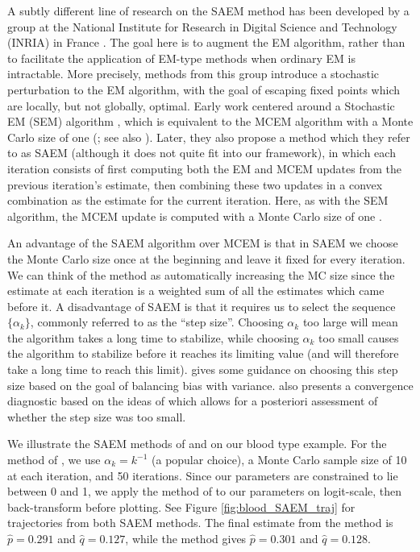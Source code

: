 \documentclass[11pt, oneside]{article}   	%
\begin{document}
A subtly different line of research on the SAEM method has been developed by a group at the National Institute for Research in Digital Science and Technology (INRIA) in France \citep[see, e.g.,][for a discussion of some of their methods]{Cel95}. The goal here is to augment the EM algorithm, rather than to facilitate the application of EM-type methods when ordinary EM is intractable. More precisely, methods from this group introduce a stochastic perturbation to the EM algorithm, with the goal of escaping fixed points which are locally, but not globally, optimal. Early work centered around a Stochastic EM (SEM) algorithm \citep{Cel85}, which is equivalent to the MCEM algorithm with a Monte Carlo size of one (\citealp{Cel87,Cel95}; see also \citealp{Nie00II}). Later, they also propose a method which they refer to as SAEM (although it does not quite fit into our framework), in which each iteration consists of first computing both the EM and MCEM updates from the previous iteration's estimate, then combining these two updates in a convex combination as the estimate for the current iteration. Here, as with the SEM algorithm, the MCEM update is computed with a Monte Carlo size of one \citep{Cel92, Cel95}.

An advantage of the SAEM algorithm over MCEM is that in SAEM we choose the Monte Carlo size once at the beginning and leave it fixed for every iteration. We can think of the method as automatically increasing the MC size since the estimate at each iteration is a weighted sum of all the estimates which came before it. A disadvantage of SAEM is that it requires us to select the sequence $\{ \alpha_k \}$, commonly referred to as the ``step size''. Choosing $\alpha_k$ too large will mean the algorithm takes a long time to stabilize, while choosing $\alpha_k$ too small causes the algorithm to stabilize before it reaches its limiting value (and will therefore take a long time to reach this limit). \citet{Jan06} gives some guidance on choosing this step size based on the goal of balancing bias with variance. \citeauthor{Jan06} also presents a convergence diagnostic based on the ideas of \citet{Caf05} which allows for a posteriori assessment of whether the step size was too small. 

We illustrate the SAEM methods of \citet{Gu98I} and \citet{Dey99} on our blood type example. For the method of \citeauthor{Gu98I}, we use $\alpha_k = k^{-1}$ (a popular choice), a Monte Carlo sample size of 10 at each iteration, and 50 iterations. Since our parameters are constrained to lie between 0 and 1, we apply the method of \citeauthor{Gu98I} to our parameters on logit-scale, then back-transform before plotting. See Figure \ref{fig:blood_SAEM_traj} for trajectories from both SAEM methods. The final estimate from the \citeauthor{Gu98I} method is $\hat{p} = 0.291$ and $\hat{q} = 0.127$, while the \citeauthor{Dey99} method gives $\hat{p} = 0.301$ and $\hat{q} = 0.128$. 
\end{document}
